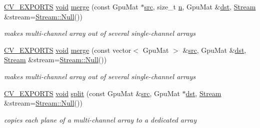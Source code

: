 \begin{DoxyCompactItemize}
\item 
\hyperlink{core_2types__c_8h_a1bf9f0e121b54272da02379cfccd0a2b}{C\-V\-\_\-\-E\-X\-P\-O\-R\-T\-S} \hyperlink{legacy_8hpp_a8bb47f092d473522721002c86c13b94e}{void} \hyperlink{namespacecv_1_1gpu_ae68befc37dc085df80653f2a08da70e7}{merge} (const Gpu\-Mat $\ast$\hyperlink{legacy_8hpp_a371cd109b74033bc4366f584edd3dacc}{src}, size\-\_\-t \hyperlink{legacy_8hpp_a76f11d9a0a47b94f72c2d0e77fb32240}{n}, Gpu\-Mat \&\hyperlink{photo__c_8h_aed13e2a25279b24dc954073233fef7a5}{dst}, \hyperlink{classcv_1_1gpu_1_1Stream}{Stream} \&stream=\hyperlink{classcv_1_1gpu_1_1Stream_af96c23564834f88333dcb8997df553f1}{Stream\-::\-Null}())
\begin{DoxyCompactList}\small\item\em makes multi-\/channel array out of several single-\/channel arrays \end{DoxyCompactList}\item 
\hyperlink{core_2types__c_8h_a1bf9f0e121b54272da02379cfccd0a2b}{C\-V\-\_\-\-E\-X\-P\-O\-R\-T\-S} \hyperlink{legacy_8hpp_a8bb47f092d473522721002c86c13b94e}{void} \hyperlink{namespacecv_1_1gpu_ae7dbb83754890a2479685d43f1fad971}{merge} (const vector$<$ Gpu\-Mat $>$ \&\hyperlink{legacy_8hpp_a371cd109b74033bc4366f584edd3dacc}{src}, Gpu\-Mat \&\hyperlink{photo__c_8h_aed13e2a25279b24dc954073233fef7a5}{dst}, \hyperlink{classcv_1_1gpu_1_1Stream}{Stream} \&stream=\hyperlink{classcv_1_1gpu_1_1Stream_af96c23564834f88333dcb8997df553f1}{Stream\-::\-Null}())
\begin{DoxyCompactList}\small\item\em makes multi-\/channel array out of several single-\/channel arrays \end{DoxyCompactList}\item 
\hyperlink{core_2types__c_8h_a1bf9f0e121b54272da02379cfccd0a2b}{C\-V\-\_\-\-E\-X\-P\-O\-R\-T\-S} \hyperlink{legacy_8hpp_a8bb47f092d473522721002c86c13b94e}{void} \hyperlink{namespacecv_1_1gpu_ab43d16adf1bd20fb4cd5cd32cf8159cd}{split} (const Gpu\-Mat \&\hyperlink{legacy_8hpp_a371cd109b74033bc4366f584edd3dacc}{src}, Gpu\-Mat $\ast$\hyperlink{photo__c_8h_aed13e2a25279b24dc954073233fef7a5}{dst}, \hyperlink{classcv_1_1gpu_1_1Stream}{Stream} \&stream=\hyperlink{classcv_1_1gpu_1_1Stream_af96c23564834f88333dcb8997df553f1}{Stream\-::\-Null}())
\begin{DoxyCompactList}\small\item\em copies each plane of a multi-\/channel array to a dedicated array \end{DoxyCompactList}\item 

\end{DoxyCompactItemize}
